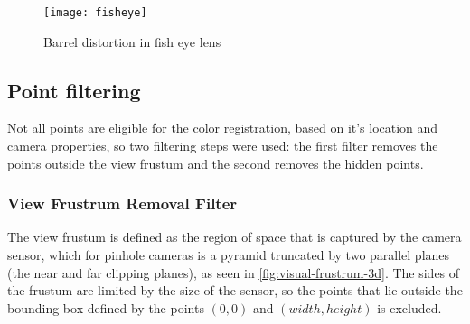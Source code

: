\begin{figure}[h]
    
    \centering
    \texttt{[image: fisheye]}

    \caption{Barrel distortion in fish eye lens}
    \label{fig:fisheye}

\end{figure}

\subsection{Point filtering}

Not all points are eligible for the color registration, based on it's location and camera properties, so two filtering steps were used: the first filter removes the points outside the view frustum and the second removes the hidden points.

\subsubsection{View Frustrum Removal Filter}

The view frustum is defined as the region of space that is captured by the camera sensor, which for pinhole cameras is a pyramid truncated by two parallel planes (the near and far clipping planes), as seen in \cref{fig:visual-frustrum-3d}. The sides of the frustum are limited by the size of the sensor, so the points that lie outside the bounding box defined by the points $(0,0)$ and $(width, height)$ is excluded.


